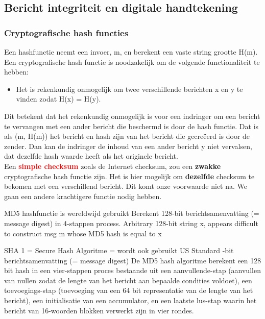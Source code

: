 \subsection{Bericht integriteit en digitale handtekening}
\subsubsection{Cryptografische hash functies}

Een hashfunctie neemt een invoer, m, en berekent een vaste string grootte H(m). Een cryptografische hash functie is noodzakelijk om de volgende functionaliteit te hebben:
\begin{itemize}
\item Het is rekenkundig onmogelijk om twee verschillende berichten x en y te vinden zodat H(x) = H(y).
\end{itemize}
Dit betekent dat het rekenkundig onmogelijk is voor een indringer om een bericht te vervangen met een ander bericht die beschermd is door de hash functie. Dat is als (m, H(m)) het bericht en hash zijn van het bericht die gecreëerd is door de zender. Dan kan de indringer de inhoud van een ander bericht y niet vervalsen, dat dezelfde hash waarde heeft als het originele bericht.\\
Een \textcolor{red}{\textbf{simple checksum}} zoals de Internet checksum, zou een \textbf{zwakke} cryptografische hash functie zijn. Het is hier mogelijk om \textbf{dezelfde} checksum te bekomen met een verschillend bericht. Dit komt onze voorwaarde niet na. We gaan een andere krachtigere functie nodig hebben.


\bi
\itf MD5 hashfunctie is wereldwijd gebruikt
    \bi
    \itf Berekent 128-bit berichtsamenvatting (= message digest) in 4-stappen process.
    \itf Arbitrary 128-bit string x, appears difficult to construct msg m whose MD5 hash is equal to x
    \ei

\itf SHA 1 = Secure Hash Algoritme = wordt ook gebruikt
    \bi
    \itf US Standard
    -bit berichtsamenvatting (= message digest)
    \ei
\ei
De MD5 hash algoritme berekent een 128 bit hash in een vier-stappen proces bestaande uit een aanvullende-stap (aanvullen van nullen zodat de lengte van het bericht aan bepaalde condities voldoet), een toevoegings-stap (toevoeging van een 64 bit representatie van de lengte van het bericht), een initialisatie van een accumulator, en een laatste lus-stap waarin het bericht van 16-woorden blokken verwerkt zijn in vier rondes.

